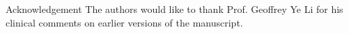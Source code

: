 \documentclass[journal]{IEEEtran}
\begin{document}
\begin{appendix}

\end{appendix}

\begin{section}{Acknowledgement}
	The authors would like to thank Prof. Geoffrey Ye Li for his clinical comments on earlier versions of the manuscript.
\end{section}




\end{document}

